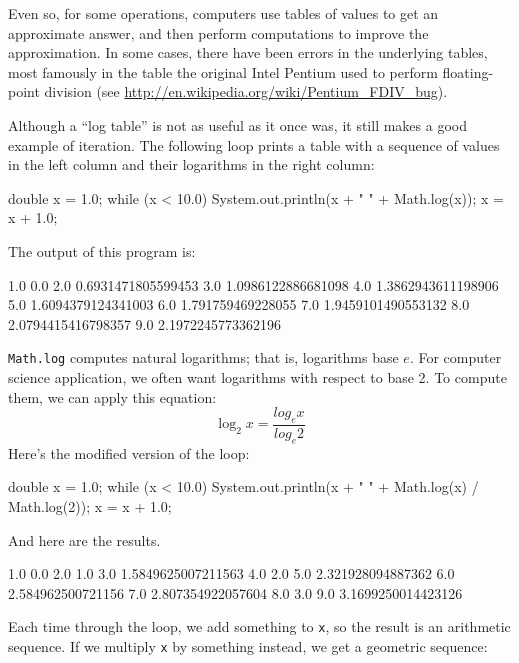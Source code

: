 \documentclass[12pt]{book}
\theoremstyle{exercise}
\newcommand{\java}[1]{\verb"#1"}
\newcommand{\java}[1]{\lstinline{#1}} %
\begin{document}

Even so, for some operations, computers use tables of values to get an approximate answer, and then perform computations to improve the approximation.
In some cases, there have been errors in the underlying tables, most famously in the table the original Intel Pentium used to perform floating-point division (see \url{http://en.wikipedia.org/wiki/Pentium_FDIV_bug}).

Although a ``log table'' is not as useful as it once was, it still makes a good example of iteration.
The following loop prints a table with a sequence of values in the left column and their logarithms in the right column:

\begin{code}
    double x = 1.0;
    while (x < 10.0) {
        System.out.println(x + "   " + Math.log(x));
        x = x + 1.0;
    }
\end{code}

The output of this program is:

\begin{stdout}
1.0   0.0
2.0   0.6931471805599453
3.0   1.0986122886681098
4.0   1.3862943611198906
5.0   1.6094379124341003
6.0   1.791759469228055
7.0   1.9459101490553132
8.0   2.0794415416798357
9.0   2.1972245773362196
\end{stdout}

\java{Math.log} computes natural logarithms; that is, logarithms base $e$.
For computer science application, we often want logarithms with respect to base 2.
To compute them, we can apply this equation:
%
\[ \log_2 x = \frac{log_e x}{log_e 2} \]
%
Here's the modified version of the loop:

\begin{code}
    double x = 1.0;
    while (x < 10.0) {
        System.out.println(x + "   " + Math.log(x) / Math.log(2));
        x = x + 1.0;
    }
\end{code}

And here are the results.

\begin{stdout}
1.0   0.0
2.0   1.0
3.0   1.5849625007211563
4.0   2.0
5.0   2.321928094887362
6.0   2.584962500721156
7.0   2.807354922057604
8.0   3.0
9.0   3.1699250014423126
\end{stdout}

Each time through the loop, we add something to \java{x}, so the result
is an arithmetic sequence.
If we multiply \java{x} by something instead, we get a geometric sequence:
\end{document}

